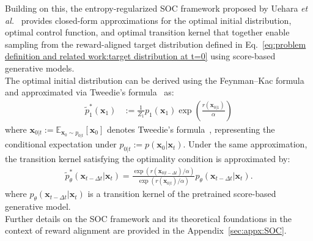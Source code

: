 Building on this, the entropy-regularized SOC framework proposed by Uehara\textit{ et al.}~\cite{uehara2024finetuningcontinuoustimediffusionmodels} provides closed-form approximations for the optimal initial distribution, optimal control function, and optimal transition kernel that together enable sampling from the reward-aligned target distribution defined in Eq.~\ref{eq:problem definition and related work:target distribution at t=0} using score-based generative models.\\
The optimal initial distribution can be derived using the Feynman–Kac formula and approximated via Tweedie’s formula~\cite{efron2011tweedie} as:
\begingroup
\setlength{\abovedisplayskip}{4pt}
\setlength{\belowdisplayskip}{4pt}
\begin{align}
    \label{eq:problem definition and related work:approx optimal inital distribution}
    \tilde{p}_1^*(\mathbf{x}_1)&:=\frac{1}{Z_1}p_1(\mathbf{x}_1)\exp\left(\frac{r(\mathbf{x}_{0|1})}{\alpha} \right)
\end{align}
\endgroup
where $\mathbf{x}_{0|t}:=\mathbb{E}_{\mathbf{x}_0\sim p_{0|t}}[\mathbf{x}_0]$ denotes Tweedie's formula~\cite{efron2011tweedie}, representing the conditional expectation under $p_{0|t} := p(\mathbf{x}_0 | \mathbf{x}_t)$.
Under the same approximation, the transition kernel satisfying the optimality condition is approximated by:
\begingroup
\setlength{\abovedisplayskip}{4pt}
\setlength{\belowdisplayskip}{4pt}
\begin{align}
    \label{eq:problem definition and related work:approx reverse kernel}
    \tilde{p}_{\theta}^*(\mathbf{x}_{t-\Delta t}|\mathbf{x}_{t})=\frac{\exp (r(\mathbf{x}_{0|t-\Delta t})/\alpha)}{\exp (r(\mathbf{x}_{0|t})/\alpha)}p_\theta(\mathbf{x}_{t-\Delta t}|\mathbf{x}_{t}).
\end{align}
\endgroup
where $p_\theta(\mathbf{x}_{t-\Delta t}|\mathbf{x}_{t})$ is a transition kernel of the pretrained score-based generative model.\\
Further details on the SOC framework and its theoretical foundations in the context of reward alignment are provided in the Appendix~\ref{sec:appx:SOC}.


